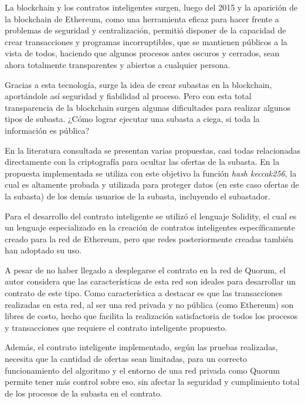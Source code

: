 \begin{conclusions}
    La blockchain y los contratos inteligentes surgen, luego del 2015 y la aparición de la blockchain de Ethereum, como una herramienta eficaz para hacer frente a problemas de seguridad y centralización, permitió disponer de la capacidad de crear transacciones y programas incorruptibles, que se mantienen públicos a la vista de todos, haciendo que algunos procesos antes oscuros y cerrados, sean ahora totalmente transparentes y abiertos a cualquier persona.

    Gracias a esta tecnología, surge la idea de crear subastas en la blockchain, aportándole así seguridad
    y fiabilidad al proceso. Pero con esta total transparencia de la blockchain surgen algunas dificultades
    para realizar algunos tipos de subasta. ¿Cómo lograr ejecutar una subasta a ciega, si toda la información
    es pública?

    En la literatura consultada se presentan varias propuestas, casi todas relacionadas directamente
    con la criptografía para ocultar las ofertas de la subasta. En la propuesta implementada se utiliza con
    este objetivo la función \textit{hash keccak256}, la cual es altamente probada y utilizada para 
    proteger datos (en este caso ofertas de la subasta) de los demás usuarios de la subasta, incluyendo 
    el subastador.

    Para el desarrollo del contrato inteligente se utilizó el lenguaje Solidity, el cual es un lenguaje
    especializado en la creación de contratos inteligentes específicamente creado para la red de 
    Ethereum, pero que redes posteriormente creadas también han adoptado su uso.

    A pesar de no haber llegado a desplegarse el contrato en la red de Quorum, el autor considera que las
    características de esta red son ideales para desarrollar un contrato de este tipo. Como característica
    a destacar es que las transacciones realizadas en esta red, al ser una red privada y no pública (como 
    Ethereum) son libres de costo, hecho que facilita la realización satisfactoria
    de todos los procesos y transacciones que requiere el contrato inteligente propuesto.

    Además, el contrato inteligente implementado, según las pruebas realizadas, necesita que la cantidad
    de ofertas sean limitadas, para un correcto funcionamiento del algoritmo y el entorno de una red
    privada como Quorum permite tener más control sobre eso, sin afectar la seguridad y cumplimiento
    total de los procesos de la subasta en el contrato.
\end{conclusions}
